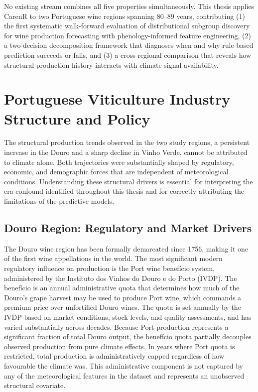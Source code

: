 No existing stream combines all five properties simultaneously. This thesis applies CarenR to two Portuguese wine regions spanning 80--89 years, contributing (1) the first systematic walk-forward evaluation of distributional subgroup discovery for wine production forecasting with phenology-informed feature engineering, (2) a two-decision decomposition framework that diagnoses when and why rule-based prediction succeeds or fails, and (3) a cross-regional comparison that reveals how structural production history interacts with climate signal availability.




\section{Portuguese Viticulture Industry Structure and Policy}\label{sec:portuguese_viticulture_industry_structure}

The structural production trends observed in the two study regions, a persistent increase in the Douro and a sharp decline in Vinho Verde, cannot be attributed to climate alone. Both trajectories were substantially shaped by regulatory, economic, and demographic forces that are independent of meteorological conditions. Understanding these structural drivers is essential for interpreting the era confound identified throughout this thesis and for correctly attributing the limitations of the predictive models.


\subsection{Douro Region: Regulatory and Market Drivers}\label{sub:douro_region_regulatory_and}

The Douro wine region has been formally demarcated since 1756, making it one of the first wine appellations in the world. The most significant modern regulatory influence on production is the Port wine benef\'icio system, administered by the Instituto dos Vinhos do Douro e do Porto (IVDP). The benef\'icio is an annual administrative quota that determines how much of the Douro's grape harvest may be used to produce Port wine, which commands a premium price over unfortified Douro wines. The quota is set annually by the IVDP based on market conditions, stock levels, and quality assessments, and has varied substantially across decades. Because Port production represents a significant fraction of total Douro output, the benef\'icio quota partially decouples observed production from pure climate effects. In years where Port quota is restricted, total production is administratively capped regardless of how favourable the climate was. This administrative component is not captured by any of the meteorological features in the dataset and represents an unobserved structural covariate.

